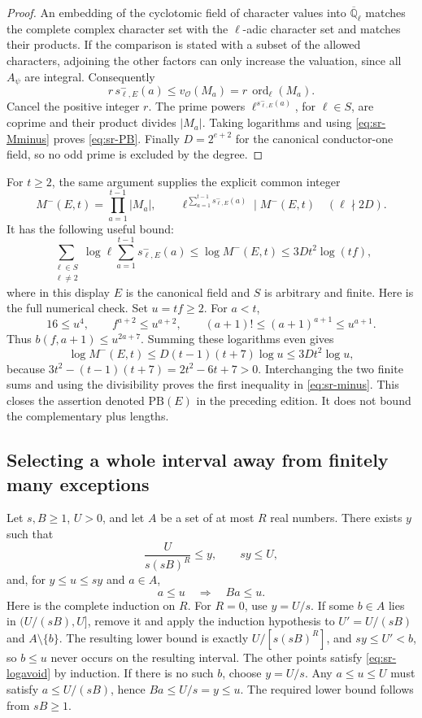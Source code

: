 \begin{proof}
An embedding of the cyclotomic field of character values into
\(\overline{\mathbb Q}_\ell\) matches the complete complex character set
with the \(\ell\)-adic character set and matches their products.
If the comparison is stated with a subset of the allowed characters,
adjoining the other factors can only increase the valuation, since
all \(A_\psi\) are integral.
Consequently
\[
 r\,s^-_{\ell,E}(a)
       \leq v_{\mathcal O}(M_a)=r\,\operatorname{ord}_\ell(M_a).
\]
Cancel the positive integer \(r\).
The prime powers
\(\ell^{s^-_{\ell,E}(a)}\), for \(\ell\in S\), are coprime and their
product divides \(|M_a|\). Taking logarithms and using
\eqref{eq:sr-Mminus} proves \eqref{eq:sr-PB}.
Finally \(D=2^{e+2}\) for the canonical conductor-one field, so no odd
prime is excluded by the degree.
\end{proof}

For \(t\geq2\), the same argument supplies the explicit common integer
\[
 M^-(E,t)=\prod_{a=1}^{t-1}|M_a|,\qquad
 \ell^{\sum_{a=1}^{t-1}s^-_{\ell,E}(a)}\mid M^-(E,t)
       \quad(\ell\nmid2D).
\]
It has the following useful bound:
\begin{equation}\label{eq:sr-minus}
 \sum_{\substack{\ell\in S\\\ell\ne2}}\log\ell
       \sum_{a=1}^{t-1}s^-_{\ell,E}(a)
 \leq\log M^-(E,t)\leq3Dt^2\log(tf),
\end{equation}
where in this display \(E\) is the canonical field and \(S\) is arbitrary
and finite. Here is the full numerical check.
Set \(u=tf\geq2\). For \(a<t\),
\[
 16\leq u^4,\qquad f^{a+2}\leq u^{a+2},\qquad
 (a+1)!\leq(a+1)^{a+1}\leq u^{a+1}.
\]
Thus \(b(f,a+1)\leq u^{2a+7}\).
Summing these logarithms even gives
\[
 \log M^-(E,t)
 \leq D(t-1)(t+7)\log u\leq3Dt^2\log u,
\]
because \(3t^2-(t-1)(t+7)=2t^2-6t+7>0\).
Interchanging the two finite sums and using the divisibility proves
the first inequality in \eqref{eq:sr-minus}.
This closes the assertion denoted \(\mathrm{PB}(E)\) in the preceding
edition. It does not bound the complementary plus lengths.

\subsection{Selecting a whole interval away from finitely many exceptions}
Let \(s,B\geq1\), \(U>0\), and let \(A\) be a set of at most \(R\)
real numbers. There exists \(y\) such that
\[
 \frac{U}{s(sB)^R}\leq y,\qquad sy\leq U,
\]
and, for \(y\leq u\leq sy\) and \(a\in A\),
\begin{equation}\label{eq:sr-logavoid}
 a\leq u\quad\Longrightarrow\quad Ba\leq u.
\end{equation}
Here is the complete induction on \(R\).
For \(R=0\), use \(y=U/s\).
If some \(b\in A\) lies in \((U/(sB),U]\), remove it and apply the
induction hypothesis to \(U'=U/(sB)\) and \(A\setminus\{b\}\).
The resulting lower bound is exactly \(U/[s(sB)^R]\), and
\(sy\leq U'<b\), so \(b\leq u\) never occurs on the resulting interval.
The other points satisfy \eqref{eq:sr-logavoid} by induction.
If there is no such \(b\), choose \(y=U/s\).
Any \(a\leq u\leq U\) must satisfy \(a\leq U/(sB)\), hence
\(Ba\leq U/s=y\leq u\).
The required lower bound follows from \(sB\geq1\).

